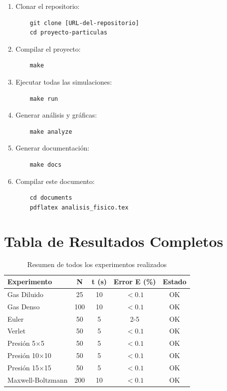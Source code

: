\documentclass[12pt,a4paper]{article}
\begin{document}
\begin{enumerate}
    \item Clonar el repositorio:
    \begin{verbatim}
    git clone [URL-del-repositorio]
    cd proyecto-particulas
    \end{verbatim}
    
    \item Compilar el proyecto:
    \begin{verbatim}
    make
    \end{verbatim}
    
    \item Ejecutar todas las simulaciones:
    \begin{verbatim}
    make run
    \end{verbatim}
    
    \item Generar análisis y gráficas:
    \begin{verbatim}
    make analyze
    \end{verbatim}
    
    \item Generar documentación:
    \begin{verbatim}
    make docs
    \end{verbatim}
    
    \item Compilar este documento:
    \begin{verbatim}
    cd documents
    pdflatex analisis_fisico.tex
    \end{verbatim}
\end{enumerate}

\section{Tabla de Resultados Completos}

\begin{table}[H]
\centering
\caption{Resumen de todos los experimentos realizados}
\begin{tabular}{|l|c|c|c|c|}
\hline
\textbf{Experimento} & \textbf{N} & \textbf{t (s)} & \textbf{Error E (\%)} & \textbf{Estado} \\
\hline
Gas Diluido & 25 & 10 & $<0.1$ & OK \\
Gas Denso & 100 & 10 & $<0.1$ & OK \\
Euler & 50 & 5 & 2-5 & OK \\
Verlet & 50 & 5 & $<0.1$ & OK \\
Presión 5×5 & 50 & 5 & $<0.1$ & OK \\
Presión 10×10 & 50 & 5 & $<0.1$ & OK \\
Presión 15×15 & 50 & 5 & $<0.1$ & OK \\
Maxwell-Boltzmann & 200 & 10 & $<0.1$ & OK \\
\hline
\end{tabular}
\end{table}
\end{document}
